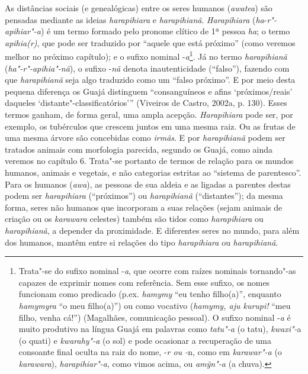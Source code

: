 As distâncias sociais (e genealógicas) entre os seres humanos
(\emph{awatea}) são pensadas mediante as ideias \emph{harapihiara} e
\emph{harapihianã}. \emph{Harapihiara} (\emph{ha}-\emph{r"-apihiar"-a}) é
um termo formado pelo pronome clítico de 1ª pessoa \emph{ha}; o termo
\emph{apihia(r)}, que pode ser traduzido por ``aquele que está próximo''
(como veremos melhor no próximo capítulo); e o sufixo nominal
-\emph{a}\footnote{Trata"-se do sufixo nominal -\emph{a}, que ocorre com
  raízes nominais tornando"-as capazes de exprimir nomes com referência.
  Sem esse sufixo, os nomes funcionam como predicado (p.ex.
  \emph{hamymy} ``eu tenho filho(a)'', enquanto \emph{hamymyra} ``o meu
  filho(a)'') ou como vocativo (\emph{hamymy, aju kurupi!} ``meu filho,
  venha cá!'') (Magalhães, comunicação pessoal). O sufixo nominal
  -\emph{a} é muito produtivo na língua Guajá em palavras como
  \emph{tatu"-a} (o tatu), \emph{kwaxi"-}a (o quati) e \emph{kwarahy"-a} (o
  sol) e pode ocasionar a recuperação de uma consoante final oculta na
  raiz do nome, -\emph{r ou -}n, como em \emph{karawar"-a} (o
  \emph{karawara}), \emph{harapihiar"-a}, como vimos acima, ou
  \emph{amỹn"-a} (a chuva).}. Já no termo \emph{harapihianã}
(\emph{ha"-r"-apihia"-nã}), o sufixo -\emph{nã} denota inautenticidade
(``falso''), fazendo com que \emph{harapihianã} seja algo traduzido como
um ``falso próximo''. E por meio desta pequena diferença os Guajá
distinguem ``consanguíneos e afins `próximos/reais' daqueles
`distante"-classificatórios''' (Viveiros de Castro, 2002a, p. 130). Esses
termos ganham, de forma geral, uma ampla acepção. \emph{Harapihiara}
pode ser, por exemplo, os tubérculos que crescem juntos em uma mesma
raiz. Ou as frutas de uma mesma árvore são concebidas como \emph{irmãs}.
E por \emph{harapihianã} podem ser tratados animais com morfologia
parecida, segundo os Guajá, como ainda veremos no capítulo 6. Trata"-se
portanto de termos de relação para os mundos humanos, animais e
vegetais, e não categorias estritas ao ``sistema de parentesco''. Para
os humanos (\emph{awa}), as pessoas de sua aldeia e as ligadas a
parentes destas podem ser \emph{harapihiara} (``próximos'') ou
\emph{harapihianã} (``distantes''); da mesma forma, seres não humanos que
incorporam a suas relações (sejam animais de criação ou os
\emph{karawara} celestes) também são tidos como \emph{harapihiara} ou
\emph{harapihianã}, a depender da proximidade. E diferentes seres no
mundo, para além dos humanos, mantêm entre si relações do tipo
\emph{harapihiara} ou \emph{harapihianã}.

